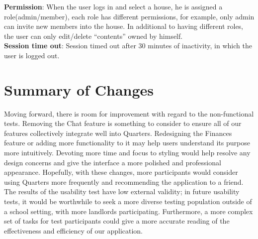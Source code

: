 \documentclass[12pt]{article}
\begin{document}
\textbf{Permission}: When the user logs in and select a house, he is assigned a role(admin/member), each role has different permissions, for example, only admin can invite new members into the house. In additional to having different roles, the user can only edit/delete ``contents'' owned by himself.\\

\textbf{Session time out}: Session timed out after 30 minutes of inactivity, in which the user is logged out.


\section{Summary of Changes}
Moving forward, there is room for improvement with regard to the non-functional tests. Removing the Chat feature is something to consider to ensure all of our features collectively integrate well into Quarters. Redesigning the Finances feature or adding more functionality to it may help users understand its purpose more intuitively. Devoting more time and focus to styling would help resolve any design concerns and give the interface a more polished and professional appearance. Hopefully, with these changes, more participants would consider using Quarters more frequently and recommending the application to a friend. The results of the usability test have low external validity; in future usability tests, it would be worthwhile to seek a more diverse testing population outside of a school setting, with more landlords participating. Furthermore, a more complex set of tasks for test participants could give a more accurate reading of the effectiveness and efficiency of our application.
\end{document}
